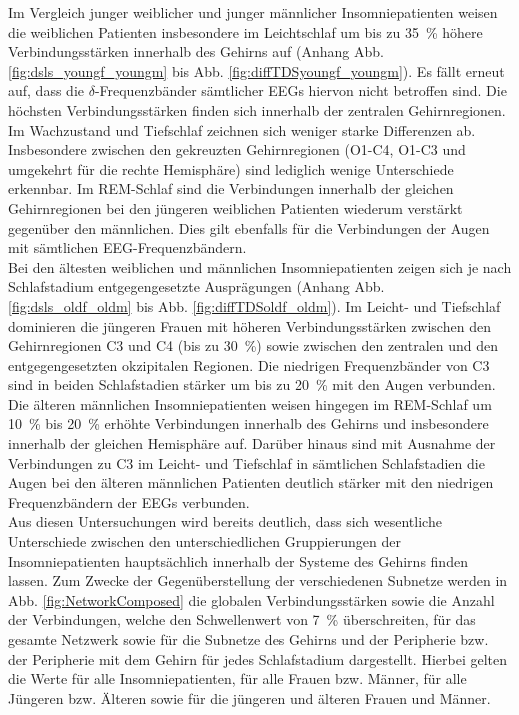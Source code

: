 Im Vergleich junger weiblicher und junger männlicher Insomniepatienten weisen die weiblichen Patienten insbesondere im Leichtschlaf um bis zu 35~\% höhere Verbindungsstärken innerhalb des Gehirns auf (Anhang Abb. \ref{fig:dsls_youngf_youngm} bis Abb. \ref{fig:diffTDSyoungf_youngm}). Es fällt erneut auf, dass die $\delta$-Frequenzbänder sämtlicher \acs{EEG}s hiervon nicht betroffen sind. Die höchsten Verbindungsstärken finden sich innerhalb der zentralen Gehirnregionen. Im Wachzustand und Tiefschlaf zeichnen sich weniger starke Differenzen ab. Insbesondere zwischen den gekreuzten Gehirnregionen (O1-C4, O1-C3 und umgekehrt für die rechte Hemisphäre) sind lediglich wenige Unterschiede erkennbar. Im \acs{REM}-Schlaf sind die Verbindungen innerhalb der gleichen Gehirnregionen bei den jüngeren weiblichen Patienten wiederum verstärkt gegenüber den männlichen. Dies gilt ebenfalls für die Verbindungen der Augen mit sämtlichen \acs{EEG}-Frequenzbändern.\\

Bei den ältesten weiblichen und männlichen Insomniepatienten zeigen sich je nach Schlafstadium entgegengesetzte Ausprägungen (Anhang Abb. \ref{fig:dsls_oldf_oldm} bis Abb. \ref{fig:diffTDSoldf_oldm}). Im Leicht- und Tiefschlaf dominieren die jüngeren Frauen mit höheren Verbindungsstärken zwischen den Gehirnregionen C3 und C4 (bis zu 30~\%) sowie zwischen den zentralen und den entgegengesetzten okzipitalen Regionen. Die niedrigen Frequenzbänder von C3 sind in beiden Schlafstadien stärker um bis zu 20~\% mit den Augen verbunden. Die älteren männlichen Insomniepatienten weisen hingegen im \acs{REM}-Schlaf um 10~\% bis 20~\% erhöhte Verbindungen innerhalb des Gehirns und insbesondere innerhalb der gleichen Hemisphäre auf. Darüber hinaus sind mit Ausnahme der Verbindungen zu C3 im Leicht- und Tiefschlaf in sämtlichen Schlafstadien die Augen bei den älteren männlichen Patienten deutlich stärker mit den niedrigen Frequenzbändern der \acs{EEG}s verbunden.\\

Aus diesen Untersuchungen wird bereits deutlich, dass sich wesentliche Unterschiede zwischen den unterschiedlichen Gruppierungen der Insomniepatienten hauptsächlich innerhalb der Systeme des Gehirns finden lassen. Zum Zwecke der Gegenüberstellung der verschiedenen Subnetze werden in Abb. \ref{fig:NetworkComposed} die globalen Verbindungsstärken sowie die Anzahl der Verbindungen, welche den Schwellenwert von 7~\% überschreiten, für das gesamte Netzwerk sowie für die Subnetze des Gehirns und der Peripherie bzw. der Peripherie mit dem Gehirn für jedes Schlafstadium dargestellt. Hierbei gelten die Werte für alle Insomniepatienten, für alle Frauen bzw. Männer, für alle Jüngeren bzw. Älteren sowie für die jüngeren und älteren Frauen und Männer.

